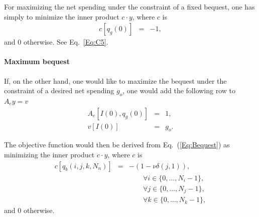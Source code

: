 \documentclass{article}[fleqn,12pt]
\begin{document}
For maximizing the net spending under the constraint of a fixed bequest, one has simply to
minimize the inner product $c\cdot y$, where $c$ is
\begin{eqnarray}
	c[q_g(0)] &=& -1,
\end{eqnarray}
and 0 otherwise. See Eq.~\ref{Eq:C5}.

\paragraph*{Maximum bequest}
If, on the other hand, one would like to maximize the bequest under the constraint of a desired net spending $g_o$,
one would add the following row to $A_ey = v$
\begin{eqnarray}
	\label{Eq:FixedIncome}
	A_e[I(0), q_g(0)] &=& 1, \nonumber \\
	v[I(0)] &=& g_o.
\end{eqnarray}

The objective function would then be derived from Eq.~(\ref{Eq:Bequest}) as
minimizing the inner product $c\cdot y$, where $c$ is
\begin{eqnarray}
	\label{Eq:MaxBequest}
	c[q_b(i, j, k, N_n)] &=& -(1 - \nu\delta(j, 1)),\\
	&&\qquad\forall i \in \{0,\ldots, N_i-1\},\nonumber\\
	&&\qquad\forall j \in \{0,\ldots, N_j-1\},\nonumber\\
	&&\qquad\forall k \in \{0,\ldots, N_k-1\},\nonumber
\end{eqnarray}
and 0 otherwise.
\end{document}
